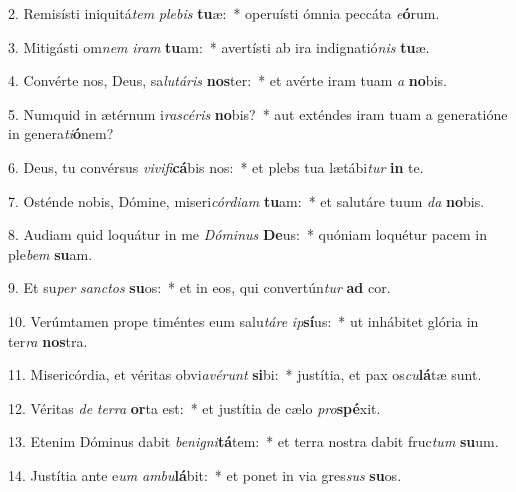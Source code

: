 2. Remisísti iniquitá\textit{tem} \textit{ple}\textit{bis} \textbf{tu}æ:~*  operuísti ómnia peccáta \textit{e}\textbf{ó}rum.\

3. Mitigásti om\textit{nem} \textit{i}\textit{ram} \textbf{tu}am:~*  avertísti ab ira indignatió\textit{nis} \textbf{tu}æ.\

4. Convérte nos, Deus, sa\textit{lu}\textit{tá}\textit{ris} \textbf{nos}ter:~*  et avérte iram tuam \textit{a} \textbf{no}bis.\

5. Numquid in ætérnum i\textit{ra}\textit{scé}\textit{ris} \textbf{no}bis?~*  aut exténdes iram tuam a generatióne in genera\textit{ti}\textbf{ó}nem?\

6. Deus, tu convérsus \textit{vi}\textit{vi}\textit{fi}\textbf{cá}bis nos:~*  et plebs tua lætábi\textit{tur} \textbf{in} te.\

7. Osténde nobis, Dómine, miseri\textit{cór}\textit{di}\textit{am} \textbf{tu}am:~*  et salutáre tuum \textit{da} \textbf{no}bis.\

8. Audiam quid loquátur in me \textit{Dó}\textit{mi}\textit{nus} \textbf{De}us:~*  quóniam loquétur pacem in ple\textit{bem} \textbf{su}am.\

9. Et su\textit{per} \textit{sanc}\textit{tos} \textbf{su}os:~*  et in eos, qui convertún\textit{tur} \textbf{ad} cor.\

10. Verúmtamen prope timéntes eum salu\textit{tá}\textit{re} \textit{ip}\textbf{sí}us:~*  ut inhábitet glória in ter\textit{ra} \textbf{nos}tra.\

11. Misericórdia, et véritas obvi\textit{a}\textit{vé}\textit{runt} \textbf{si}bi:~*  justítia, et pax os\textit{cu}\textbf{lá}tæ sunt.\

12. Véritas \textit{de} \textit{ter}\textit{ra} \textbf{or}ta est:~*  et justítia de cælo \textit{pro}\textbf{spé}xit.\

13. Etenim Dóminus dabit \textit{be}\textit{ni}\textit{gni}\textbf{tá}tem:~*  et terra nostra dabit fruc\textit{tum} \textbf{su}um.\

14. Justítia ante e\textit{um} \textit{am}\textit{bu}\textbf{lá}bit:~*  et ponet in via gres\textit{sus} \textbf{su}os.\

